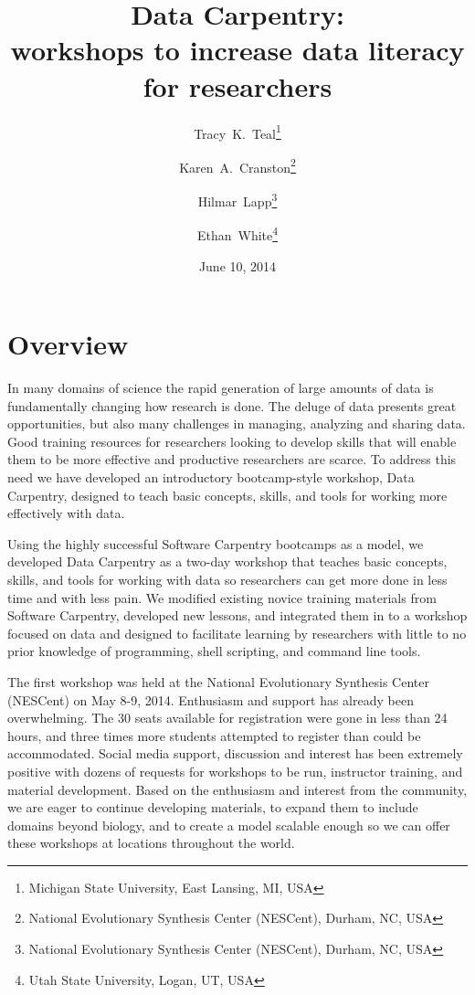 \documentclass[11pt]{article}
\begin{document}
\title{Data Carpentry: \\workshops to increase data literacy for researchers\vspace{-1ex}}
\author{Tracy~K.~Teal\thanks{Michigan State University, East Lansing, MI, USA} \and Karen~A.~Cranston\thanks{National Evolutionary Synthesis Center (NESCent), Durham, NC, USA} \and Hilmar~Lapp\thanks{National Evolutionary Synthesis Center (NESCent), Durham, NC, USA} \and Ethan~White\thanks{Utah State University, Logan, UT, USA}\vspace{-2ex}}
\date{June 10, 2014\vspace{-2ex}}



\maketitle


\section{Overview }
In many domains of science the rapid generation of large
amounts of data is fundamentally changing how research is done. The deluge of data presents great
opportunities, but also many challenges in managing, analyzing and
sharing data. Good training resources for researchers looking to develop
skills that will enable them to be more effective and
productive researchers are scarce. To address this need we have
developed an introductory bootcamp-style workshop, Data Carpentry,
designed to teach basic concepts, skills, and tools for working more
effectively with data.

Using the highly successful Software Carpentry bootcamps as a model,
we developed Data Carpentry as a two-day workshop that teaches basic
concepts, skills, and tools for working with data so researchers can
get more done in less time and with less pain. We modified existing
novice training materials from Software Carpentry,
developed new lessons, and integrated them in to a workshop focused on 
data and designed to
facilitate learning by researchers with little to no prior knowledge of
programming, shell scripting, and command line tools.

The first workshop was held at the National Evolutionary Synthesis
Center (NESCent) on May 8-9, 2014. 
Enthusiasm and support has already been overwhelming. The 30 seats
available for registration were gone in less than 24 hours, and
three times more students attempted to register than could be accommodated. Social media
support, discussion and interest has been extremely positive with
dozens of requests for workshops to be run, instructor
training, and material development. Based on the enthusiasm and
interest from the community, we are eager to continue developing
materials, to expand them to include domains beyond biology, and to
create a model scalable enough so we can offer these workshops at
locations throughout the world.
\end{document}
